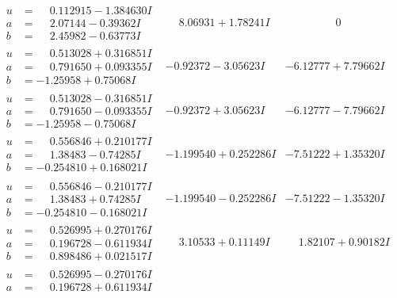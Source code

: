 \documentclass[1p]{elsarticle_modified}
\theoremstyle{definition}
\begin{document}
$$\begin{array}{c|c|c}
 \hline 
\begin{aligned}
u &= \phantom{-}0.112915 - 1.384630 I \\
a &= \phantom{-}2.07144 - 0.39362 I \\
b &= \phantom{-}2.45982 - 0.63773 I\end{aligned}
 & \phantom{-}8.06931 + 1.78241 I & \phantom{-0.000000 } 0 \\ \hline\begin{aligned}
u &= \phantom{-}0.513028 + 0.316851 I \\
a &= \phantom{-}0.791650 + 0.093355 I \\
b &= -1.25958 + 0.75068 I\end{aligned}
 & -0.92372 - 3.05623 I & -6.12777 + 7.79662 I \\ \hline\begin{aligned}
u &= \phantom{-}0.513028 - 0.316851 I \\
a &= \phantom{-}0.791650 - 0.093355 I \\
b &= -1.25958 - 0.75068 I\end{aligned}
 & -0.92372 + 3.05623 I & -6.12777 - 7.79662 I \\ \hline\begin{aligned}
u &= \phantom{-}0.556846 + 0.210177 I \\
a &= \phantom{-}1.38483 - 0.74285 I \\
b &= -0.254810 + 0.168021 I\end{aligned}
 & -1.199540 + 0.252286 I & -7.51222 + 1.35320 I \\ \hline\begin{aligned}
u &= \phantom{-}0.556846 - 0.210177 I \\
a &= \phantom{-}1.38483 + 0.74285 I \\
b &= -0.254810 - 0.168021 I\end{aligned}
 & -1.199540 - 0.252286 I & -7.51222 - 1.35320 I \\ \hline\begin{aligned}
u &= \phantom{-}0.526995 + 0.270176 I \\
a &= \phantom{-}0.196728 - 0.611934 I \\
b &= \phantom{-}0.898486 + 0.021517 I\end{aligned}
 & \phantom{-}3.10533 + 0.11149 I & \phantom{-}1.82107 + 0.90182 I \\ \hline\begin{aligned}
u &= \phantom{-}0.526995 - 0.270176 I \\
a &= \phantom{-}0.196728 + 0.611934 I \\

\end{aligned}
\end{array}$$
\end{document}
